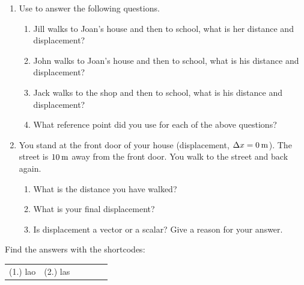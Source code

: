         \label{m38788*id64042}\begin{enumerate}[noitemsep, label=\textbf{\arabic*}. ] 
            \label{m38788*uid20}\item Use  to answer the following questions.
\label{m38788*id64060}\begin{enumerate}[noitemsep, label=\textbf{\alph*}. ] 
            \label{m38788*uid21}\item Jill walks to Joan's house and then to school, what is her distance and displacement?
\label{m38788*uid22}\item John walks to Joan's house and then to school, what is his distance and displacement?
\label{m38788*uid23}\item Jack walks to the shop and then to school, what is his distance and displacement?
\label{m38788*uid24}\item What reference point did you use for each of the above questions?
\end{enumerate}
                \label{m38788*uid25}\item You stand at the front door of your house (displacement, \begin{math}\Delta x=0\phantom{\rule{2pt}{0ex}}\mathrm{m}\end{math}). The street is \begin{math}10\phantom{\rule{2pt}{0ex}}\mathrm{m}\end{math} away from the front door. You walk to the street and back again.
\label{m38788*id64141}\begin{enumerate}[noitemsep, label=\textbf{\alph*}. ] 
            \label{m38788*uid26}\item What is the distance you have walked?
\label{m38788*uid27}\item What is your final displacement?
\label{m38788*uid28}\item Is displacement a vector or a scalar? Give a reason for your answer.
\end{enumerate}
                \end{enumerate}
        
        

      
    

  \label{m38788**end}
          
\par {} Find the answers with the shortcodes:
 \par \begin{tabular}[h]{cccccc}
 (1.) lao  &  (2.) las  & \end{tabular}



